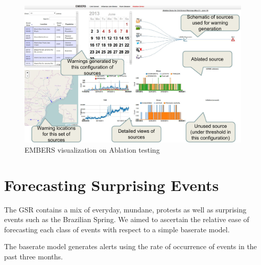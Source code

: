 \documentclass[11pt,a4paper,extrafontsizes,oneside]{article}
\begin{document}
\begin{figure}
\includegraphics[width=\columnwidth]{ablation}
\caption{EMBERS visualization on Ablation testing}
\label{fig:ablation}
\end{figure}



\begin{table}
\small
\caption{Comparison of performance metrics with and without social media sources. Social Media sources contributes a lot towards recall but loses out on
lead-time.}
\label{tb:ablation_twitter}
\vspace{-3mm}
\vspace{-5mm}
\end{table}


\section{Forecasting Surprising Events}
\label{sec:suprising}
The GSR contains a mix of everyday, mundane, protests as well as surprising events such as the Brazilian Spring.
We aimed to ascertain the relative ease of forecasting each class of events
with respect to a simple baserate model.

The baserate model generates alerts using the rate of occurrence of events in the past three months.
\end{document}
